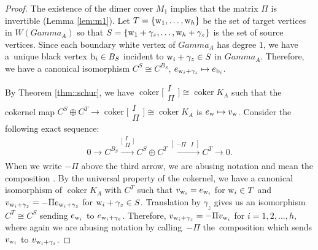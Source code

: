 \documentclass[10pt,a4paper]{amsart}
\numberwithin{equation}{section}
\newcommand{\C}{{\mathbb C}}
\newcommand{\A}{{\mathbb A}}
\newcommand{\ra}{\rightarrow}
\newcommand{\w}{{\rm w}}
\newcommand{\bw}{{\rm b}}
\DeclareMathOperator{\coker}{coker}
\def\A{A}
\def\Gamma{Gamma}
\def\C{C}
\begin{document}
	\begin{proof}
		The existence of the dimer cover $M_1$ implies that the matrix $\Pi$ is invertible (Lemma \ref{lem:m1}). Let $T=\{{\rm w}_1,\dots,{\rm w}_h\}$ be the set of target vertices in $W(\Gamma_{\A})$ so that $S=\{{\rm w}_1+\gamma_z,\dots,{\rm w}_h+\gamma_z\}$ is the set of source vertices. Since each boundary white vertex of $\Gamma_\A$ has degree $1$, we have a~unique black vertex $\bw_i \in B_S$ incident to $\w_i+\gamma_z \in S$ in $\Gamma_\A$. Therefore, we have a canonical isomorphism $\C^{S} \cong \C^{B_S}$, $e_{\w_i+\gamma_z} \mapsto e_{{\mathrm b}_i}$.
		
		By Theorem \ref{thm::schur}, we have $\coker \bigl[\begin{smallmatrix}
			I\\
			\Pi
		\end{smallmatrix}\bigr] \cong \coker K_\A$ such that the cokernel map $\C^S \oplus \C^T \ra \coker \bigl[\begin{smallmatrix}
			I\\
			\Pi
		\end{smallmatrix}\bigr] \cong \coker K_\A$ is $e_\w \mapsto v_\w$. Consider the following exact sequence:
		\[
		0 \ra \C^{B_S} \xrightarrow[]{\bigl[\begin{smallmatrix}
				I\\
				\Pi
		\end{smallmatrix}\bigr]} \C^S \oplus \C^T \xrightarrow[]{[\begin{smallmatrix}
				-\Pi & I
		\end{smallmatrix}]} \C^T \ra 0.
		\]
		When we write $-\Pi$ above the third arrow, we are abusing notation and mean the composition \smash{$\C^S \cong \C^{B_S} \xrightarrow[]{-\Pi} \C^T$}. By the universal property of the cokernel, we have a canonical isomorphism of $\coker K_\A$ with $\C^T$ such that $v_{\w_i} = e_{\w_i} $ for $\w_i \in T$ and $v_{\w_i+\gamma_z} = -\Pi e_{\w_i+\gamma_z}$ for ${\w_i+\gamma_z \in S}$. Translation by $\gamma_z$ gives us an isomorphism $\C^T \cong \C^S$ sending $e_{\w_i}$ to $e_{\w_i + \gamma_z}$. Therefore, ${v_{{\rm w}_i+\gamma_z}=-\Pi{}v_{{\rm w}_i}}$ for $i=1,2,\dots,h$, where again we are abusing notation by calling~$-\Pi$ the~composition \smash{$\C^T \cong \C^S \xrightarrow[]{-\Pi} \C^T$} which sends $v_{\w _i}$ to $v_{\w_i + \gamma_z}$.
		

\end{proof}
\end{document}
